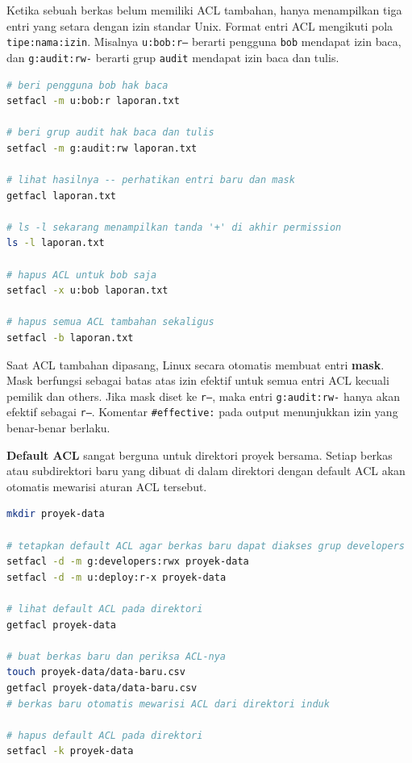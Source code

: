 Ketika sebuah berkas belum memiliki ACL tambahan,  hanya menampilkan tiga entri yang setara dengan izin standar Unix. Format entri ACL mengikuti pola \texttt{tipe:nama:izin}. Misalnya \texttt{u:bob:r--} berarti pengguna \texttt{bob} mendapat izin baca, dan \texttt{g:audit:rw-} berarti grup \texttt{audit} mendapat izin baca dan tulis.

\begin{lstlisting}[language=bash, caption={Menambah dan menghapus entri ACL}]
# beri pengguna bob hak baca
setfacl -m u:bob:r laporan.txt

# beri grup audit hak baca dan tulis
setfacl -m g:audit:rw laporan.txt

# lihat hasilnya -- perhatikan entri baru dan mask
getfacl laporan.txt

# ls -l sekarang menampilkan tanda '+' di akhir permission
ls -l laporan.txt

# hapus ACL untuk bob saja
setfacl -x u:bob laporan.txt

# hapus semua ACL tambahan sekaligus
setfacl -b laporan.txt
\end{lstlisting}

Saat ACL tambahan dipasang, Linux secara otomatis membuat entri \textbf{mask}. Mask berfungsi sebagai batas atas izin efektif untuk semua entri ACL kecuali pemilik dan others. Jika mask diset ke \texttt{r--}, maka entri \texttt{g:audit:rw-} hanya akan efektif sebagai \texttt{r--}. Komentar \texttt{\#effective:} pada output  menunjukkan izin yang benar-benar berlaku.

\textbf{Default ACL} sangat berguna untuk direktori proyek bersama. Setiap berkas atau subdirektori baru yang dibuat di dalam direktori dengan default ACL akan otomatis mewarisi aturan ACL tersebut.

\begin{lstlisting}[language=bash, caption={Default ACL pada direktori proyek}]
mkdir proyek-data

# tetapkan default ACL agar berkas baru dapat diakses grup developers
setfacl -d -m g:developers:rwx proyek-data
setfacl -d -m u:deploy:r-x proyek-data

# lihat default ACL pada direktori
getfacl proyek-data

# buat berkas baru dan periksa ACL-nya
touch proyek-data/data-baru.csv
getfacl proyek-data/data-baru.csv
# berkas baru otomatis mewarisi ACL dari direktori induk

# hapus default ACL pada direktori
setfacl -k proyek-data
\end{lstlisting}

